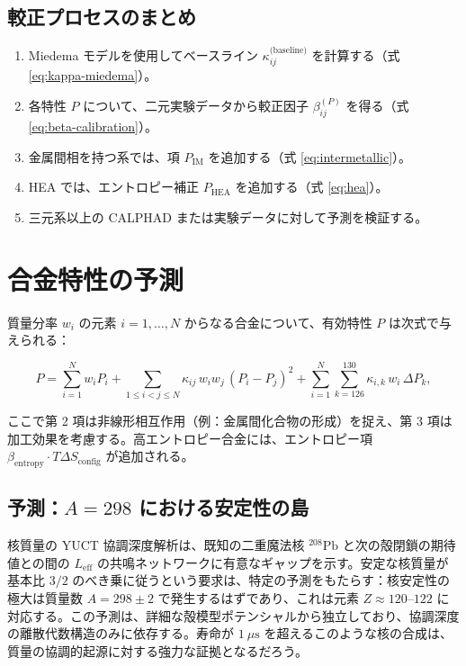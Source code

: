 \documentclass[11pt,a4paper]{article}
\theoremstyle{remark}
\begin{document}
	\subsection{較正プロセスのまとめ}
	
	\begin{enumerate}
		\item Miedema モデルを使用してベースライン \(\kappa_{ij}^{\text{(baseline)}}\) を計算する（式 \ref{eq:kappa-miedema}）。
		\item 各特性 \(P\) について、二元実験データから較正因子 \(\beta_{ij}^{(P)}\) を得る（式 \ref{eq:beta-calibration}）。
		\item 金属間相を持つ系では、項 \(P_{\text{IM}}\) を追加する（式 \ref{eq:intermetallic}）。
		\item HEA では、エントロピー補正 \(P_{\text{HEA}}\) を追加する（式 \ref{eq:hea}）。
		\item 三元系以上の CALPHAD または実験データに対して予測を検証する。
	\end{enumerate}
	
	\section{合金特性の予測}
	
	質量分率 \(w_i\) の元素 \(i = 1,\dots,N\) からなる合金について、有効特性 \(P\) は次式で与えられる：
	
	\[
	P = \sum_{i=1}^{N} w_i P_i
	+ \sum_{1\le i<j\le N} \kappa_{ij}\, w_i w_j\, (P_i - P_j)^2
	+ \sum_{i=1}^{N} \sum_{k=126}^{130} \kappa_{i,k}\, w_i\, \Delta P_k,
	\]
	
	ここで第 2 項は非線形相互作用（例：金属間化合物の形成）を捉え、第 3 項は加工効果を考慮する。高エントロピー合金には、エントロピー項 \(\beta_{\text{entropy}} \cdot T \Delta S_{\text{config}}\) が追加される。
	
	\subsection{予測：\(A=298\) における安定性の島}
	
	核質量の YUCT 協調深度解析は、既知の二重魔法核 \(^{208}\mathrm{Pb}\) と次の殻閉鎖の期待値との間の \(L_{\mathrm{eff}}\) の共鳴ネットワークに有意なギャップを示す。安定な核質量が基本比 \(3/2\) のべき乗に従うという要求は、特定の予測をもたらす：核安定性の極大は質量数 \(A = 298 \pm 2\) で発生するはずであり、これは元素 \(Z \approx 120\)–\(122\) に対応する。この予測は、詳細な殻模型ポテンシャルから独立しており、協調深度の離散代数構造のみに依存する。寿命が \(1\ \mu\text{s}\) を超えるこのような核の合成は、質量の協調的起源に対する強力な証拠となるだろう。
	
\end{document}
